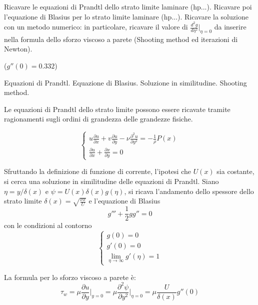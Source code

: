 \noindent
\begin{exerciseS}
Ricavare le equazioni di Prandtl dello strato limite laminare (hp...). Ricavare poi l'equazione
 di Blasius per lo strato limite laminare (hp...). Ricavare la soluzione con un metodo numerico:
  in particolare, ricavare il valore di $\frac{d^2 g}{d\eta^2}\big|_{\eta=0}$ da inserire nella formula
  dello sforzo viscoso a parete (Shooting method ed iterazioni di Newton).
  
($g''(0) = 0.332$)
\end{exerciseS}

\sol

\partone Equazioni di Prandtl. Equazione di Blasius. Soluzione in similitudine. 
Shooting method.

\parttwo Le equazioni di Prandtl dello strato limite possono essere ricavate tramite 
ragionamenti sugli ordini di grandezza delle grandezze fisiche.

\begin{equation}
  \begin{cases}
    u\frac{\partial u}{\partial x} + v\frac{\partial u}{\partial y} - \nu \frac{\partial^2 u}{\partial y^2} = - \frac{1}{\rho}P(x) \\
    \frac{\partial u}{\partial x} + \frac{\partial x}{\partial y} = 0
  \end{cases}
\end{equation}

Sfruttando la definizione di funzione di corrente, l'ipotesi che $U(x)$ sia costante, si cerca una soluzione
in similitudine delle equazioni di Prandtl.
Siano $\eta = y/\delta(x)$ e $\psi = U(x) \delta(x) g(\eta)$, si ricava l'andamento dello spessore dello strato 
limite $\delta(x) = \sqrt{\frac{\nu x}{U}}$ e l'equazione di Blasius
\begin{equation}
 g''' + \frac{1}{2} g g'' = 0
\end{equation}
con le condizioni al contorno
\begin{equation}
 \begin{cases}
 g(0) = 0 \\
 g'(0) = 0 \\
 \lim_{\eta\to \infty}
 g'(\eta) = 1
 \end{cases}
\end{equation}

La formula per lo sforzo viscoso a parete è:
\begin{equation}
  \tau_w = \mu \frac{\partial u}{\partial y}\big|_{y=0} = \mu \frac{\partial^2 \psi}{\partial y^2}\big|_{\eta=0} = 
  \mu \frac{U}{\delta(x)} g''(0)
\end{equation}

